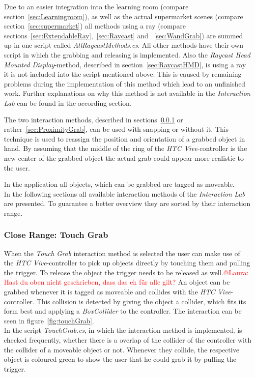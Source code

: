 Due to an easier integration into the learning room (compare section~\ref{sec:Learningroom}), as well as the actual supermarket scenes (compare section~\ref{sec:supermarket}) all methods using a ray (compare sections~\ref{sec:ExtendableRay},~\ref{sec:Raycast} and ~\ref{sec:WandGrab}) are summed up in one script called \textit{AllRaycastMethods.cs}. All other methods have their own script in which the grabbing and releasing is implemented. Also the \textit{Raycast Head Mounted Display}-method, described in section~\ref{sec:RaycastHMD}, is using a ray it is not included into the script mentioned above. This is caused by remaining problems during the implementation of this method which lead to an unfinished work. Further explanations on why this method is not available in the \textit{Interaction Lab} can be found in the according section.

The two interaction methods, described in sections~\ref{sec:TouchGrab} or rather~\ref{sec:ProximityGrab}, can be used with snapping or without it. This technique is used to reassign the position and orientation of a grabbed object in hand. By assuming that the middle of the ring of the \textit{HTC Vive}-controller is the new center of the grabbed object the actual grab could appear more realistic to the user. 

In the application all objects, which can be grabbed are tagged as moveable.\\

In the following sections all available interaction methods of the \textit{Interaction Lab} are presented. To guarantee a better overview they are sorted by their interaction range. 

\subsubsection{Close Range: Touch Grab} \label{sec:TouchGrab}
When the \textit{Touch Grab} interaction method is selected the user can make use of the \textit{HTC Vive}-controller to pick up objects directly by touching them and pulling the trigger. To release the object the trigger needs to be released as well.\textcolor{red}{@Laura: Hast du oben nicht geschrieben, dass das eh für alle gilt?} An object can be grabbed whenever it is tagged as moveable and collides with the \textit{HTC Vive}-controller. This collision is detected by giving the object a collider, which fits its form best \cite{website:BoxCollider}\cite{website:SphereCollider} and applying a \textit{BoxCollider} to the controller. The interaction can be seen in figure~\ref{fig:touchGrab}. \\
In the script \textit{TouchGrab.cs}, in which the interaction method is implemented, is checked frequently, whether there is a overlap of the collider of the controller with the collider of a moveable object or not. Whenever they collide, the respective object is coloured green to show the user that he could grab it by pulling the trigger. 

